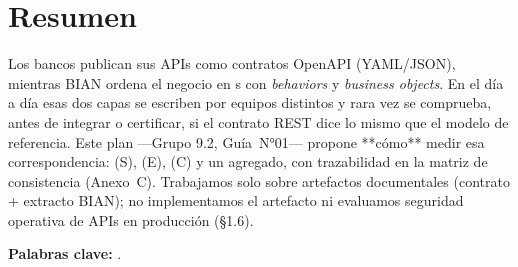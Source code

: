\chapter*{Resumen}

Los bancos publican sus APIs como contratos OpenAPI (YAML/JSON), mientras BIAN ordena el negocio
en \ServiceDomain{}s con \textit{behaviors} y \textit{business objects}. En el día a día esas dos
capas se escriben por equipos distintos y rara vez se comprueba, antes de integrar o certificar, si
el contrato REST dice lo mismo que el modelo de referencia. Este plan ---Grupo 9.2, Guía~N°01---
propone **cómo** medir esa correspondencia: \SemanticScore{} (S), \StructuralScore{} (E),
\CoverageScore{} (C) y un \AlignmentScore{} agregado, con trazabilidad en la matriz de
consistencia (Anexo~C). Trabajamos solo sobre artefactos documentales (contrato + extracto BIAN);
no implementamos el artefacto ni evaluamos seguridad operativa de APIs en producción (§1.6).

\vspace{0.5cm}
\noindent\textbf{Palabras clave:} \palabrasClaveES.

